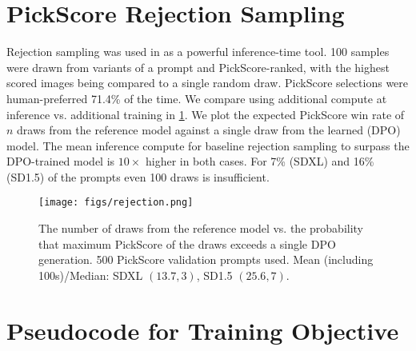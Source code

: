 \documentclass[10pt,twocolumn,letterpaper]{article}
\begin{document}
\section{PickScore Rejection Sampling} Rejection sampling was used in \cite{pickscore} as a powerful inference-time tool. 100 samples were drawn from variants of a prompt and PickScore-ranked, with the highest scored images being compared to a single random draw. PickScore selections were human-preferred 71.4\% of the time. We compare using additional compute at inference vs. additional training in \cref{fig:rejection_sampling}. We plot the expected PickScore win rate of $n$ draws from the reference model against a single draw from the learned (DPO) model.
The mean inference compute for baseline rejection sampling to surpass the DPO-trained model is $10\times$ higher in both cases. For 7\% (SDXL) and 16\% (SD1.5) of the prompts even 100 draws is insufficient.





\begin{figure}[h]
    \centering
    \texttt{[image: figs/rejection.png]}
    \caption{
    The number of draws from the reference model vs. the probability that maximum PickScore of the draws exceeds a single DPO generation. 500 PickScore validation prompts used. Mean (including 100s)/Median: SDXL $(13.7,3)$, SD1.5 $(25.6, 7)$.
    }
    \label{fig:rejection_sampling}
\end{figure}

\newpage

\section{Pseudocode for Training Objective}
\end{document}
